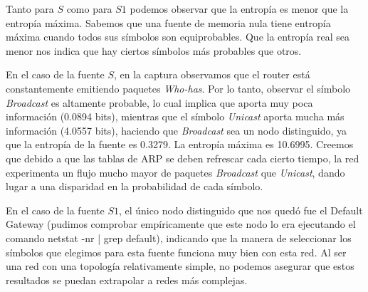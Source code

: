 Tanto para $S$ como para $S1$ podemos observar que la entropía es menor que la entropía máxima. Sabemos que una fuente de memoria nula tiene entropía máxima cuando todos sus símbolos son equiprobables. Que la entropía real sea menor nos indica que hay ciertos símbolos más probables que otros. 

En el caso de la fuente $S$, en la captura observamos que el router está constantemente emitiendo paquetes \textit{Who-has}. Por lo tanto, observar el símbolo \textit{Broadcast} es altamente probable, lo cual implica que aporta muy poca información (0.0894 bits), mientras que el símbolo \textit{Unicast} aporta mucha más información (4.0557 bits), haciendo que \textit{Broadcast} sea un nodo distinguido, ya que la entropía de la fuente es 0.3279. La entropía máxima es 10.6995. Creemos que debido a que las tablas de ARP se deben refrescar cada cierto tiempo, la red experimenta un flujo mucho mayor de paquetes \textit{Broadcast} que \textit{Unicast}, dando lugar a una disparidad en la probabilidad de cada símbolo.

En el caso de la fuente $S1$, el único nodo distinguido que nos quedó fue el Default Gateway (pudimos comprobar empíricamente que este nodo lo era ejecutando el comando netstat -nr | grep default), indicando que la manera de seleccionar los símbolos que elegimos para esta fuente funciona muy bien con esta red. Al ser una red con una topología relativamente simple, no podemos asegurar que estos resultados se puedan extrapolar a redes más complejas.
